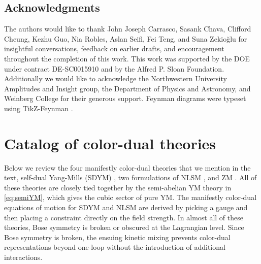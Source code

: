 \documentclass[11pt,letter]{article}
\begin{document}
\subsection*{Acknowledgments}
The authors would like to thank John Joseph Carrasco, Sasank Chava, Clifford Cheung, Kezhu Guo, Nia Robles, Aslan Seifi, Fei Teng, and Suna Zekio\u{g}lu for insightful conversations,
feedback on earlier drafts, and encouragement throughout the completion of
this work. This work was supported by the DOE under contract
DE-SC0015910 and by the Alfred P. Sloan
Foundation. Additionally we would like to acknowledge the Northwestern
University Amplitudes and Insight group, the Department of Physics and
Astronomy, and Weinberg College for their generous support.  Feynman
diagrams were typeset using TikZ-Feynman \cite{Ellis:2016jkw}.

\appendix
\section{Catalog of color-dual theories}
\label{sec:CKLagrangians}

Below we review the four manifestly color-dual theories that we mention in
the text, self-dual Yang-Mills (SDYM) \cite{Monteiro2011pc}, two formulations of NLSM \cite{Cheung:2016prv,Cheung:2020djz,Cheung:2021zvb}, and ZM \cite{Zakharov:1973pp, Cheung:2022mix}.  All
of these theories are closely tied together by the semi-abelian YM
theory in \cref{eq:semiYM}, which gives the cubic sector of pure YM.
The manifestly color-dual equations of motion for SDYM and NLSM are
derived by picking a gauge and then placing a constraint directly on the
field strength. In almost all of these
theories, Bose symmetry is broken or obscured at the Lagrangian level.
Since Bose symmetry is broken, the ensuing kinetic mixing prevents color-dual representations beyond one-loop without the introduction of additional interactions.
\end{document}
